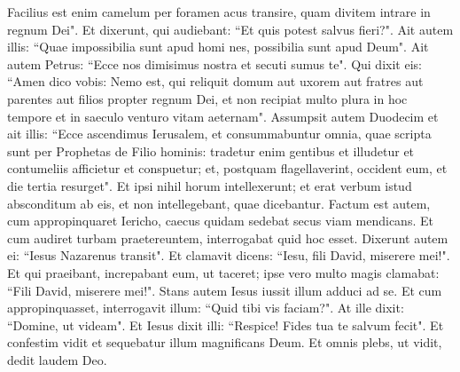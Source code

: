 \begin{biblechapter}
\verse Facilius est enim camelum per foramen acus transire, quam divitem intrare in regnum Dei". 
\verse Et dixerunt, qui audiebant: “Et quis potest salvus fieri?". 
\verse Ait autem illis: “Quae impossibilia sunt apud homi nes, possibilia sunt apud Deum". 
\verse Ait autem Petrus: “Ecce nos dimisimus nostra et secuti sumus te". 
\verse Qui dixit eis: “Amen dico vobis: Nemo est, qui reliquit domum aut uxorem aut fratres aut parentes aut filios propter regnum Dei, 
\verse et non recipiat multo plura in hoc tempore et in saeculo venturo vitam aeternam". 
\verse Assumpsit autem Duodecim et ait illis: “Ecce ascendimus Ierusalem, et consummabuntur omnia, quae scripta sunt per Prophetas de Filio hominis: 
\verse tradetur enim gentibus et illudetur et contumeliis afficietur et conspuetur;  
\verse et, postquam flagellaverint, occident eum, et die tertia resurget". 
\verse Et ipsi nihil horum intellexerunt; et erat verbum istud absconditum ab eis, et non intellegebant, quae dicebantur. 
\verse Factum est autem, cum appropinquaret Iericho, caecus quidam sedebat secus viam mendicans. 
\verse Et cum audiret turbam praetereuntem, interrogabat quid hoc esset. 
\verse Dixerunt autem ei: “Iesus Nazarenus transit". 
\verse Et clamavit dicens: “Iesu, fili David, miserere mei!". 
\verse Et qui praeibant, increpabant eum, ut taceret; ipse vero multo magis clamabat: “Fili David, miserere mei!". 
\verse Stans autem Iesus iussit illum adduci ad se. Et cum appropinquasset, interrogavit illum: 
\verse “Quid tibi vis faciam?". At ille dixit: “Domine, ut videam". 
\verse Et Iesus dixit illi: “Respice! Fides tua te salvum fecit". 
\verse Et confestim vidit et sequebatur illum magnificans Deum. Et omnis plebs, ut vidit, dedit laudem Deo. 
\end{biblechapter}

